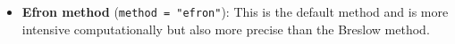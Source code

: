\begin{itemize}
\begin{itemize}

\item \textbf{Efron method} ({\tt method = "efron"}): This is the default method and is more intensive computationally but also more precise than the Breslow method.



\end{itemize}
\end{itemize}
